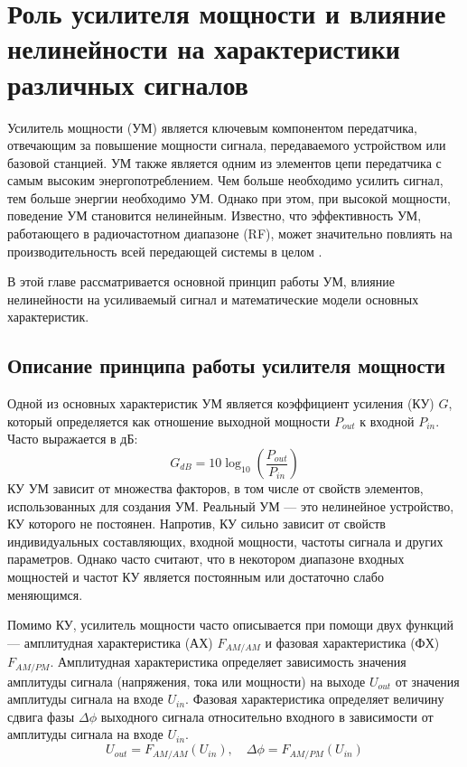 \section{Роль усилителя мощности и влияние нелинейности
на характеристики различных сигналов}
Усилитель мощности (УМ) является ключевым компонентом передатчика,
отвечающим за повышение мощности сигнала, передаваемого устройством или
базовой станцией. УМ также является одним из элементов цепи передатчика с
самым высоким энергопотреблением. Чем больше необходимо усилить сигнал, тем
больше энергии необходимо УМ. Однако при этом, при высокой мощности,
поведение УМ становится нелинейным. Известно, что эффективность УМ,
работающего в радиочастотном диапазоне (RF), может значительно повлиять на
производительность всей передающей системы
в целом \cite{Lie2018}.

В этой главе рассматривается основной принцип работы УМ, влияние
нелинейности на усиливаемый сигнал и математические модели основных
характеристик.


\subsection{Описание принципа работы усилителя мощности}
Одной из основных характеристик УМ является коэффициент усиления (КУ) $G$,
который определяется как отношение выходной мощности $P_{out}$ к входной
$P_{in}$. Часто выражается в дБ:
\begin{equation}
    G_{dB} = 10\log_{10}\left(\frac{P_{out}}{P_{in}}\right)
\end{equation}
КУ УМ зависит от множества факторов, в том числе от свойств элементов,
использованных для создания УМ. Реальный УМ — это нелинейное устройство, КУ
которого не постоянен. Напротив, КУ сильно зависит от свойств
индивидуальных составляющих, входной мощности, частоты сигнала и других
параметров. Однако часто считают, что в некотором диапазоне входных
мощностей и частот КУ является постоянным или достаточно слабо
меняющимся.

Помимо КУ, усилитель мощности часто описывается при помощи двух функций —
амплитудная характеристика (АХ) $F_{AM/AM}$ и фазовая характеристика (ФХ)
$F_{AM/PM}$. Амплитудная характеристика определяет зависимость значения
амплитуды сигнала (напряжения, тока или мощности) на выходе $U_{out}$ от
значения амплитуды сигнала на входе $U_{in}$. Фазовая характеристика
определяет величину сдвига фазы $\Delta\phi$ выходного сигнала относительно
входного в зависимости от амплитуды сигнала на входе $U_{in}$.
\begin{equation}
    U_{out} = F_{AM/AM}(U_{in}), \quad \Delta\phi = F_{AM/PM}(U_{in})
\end{equation}

